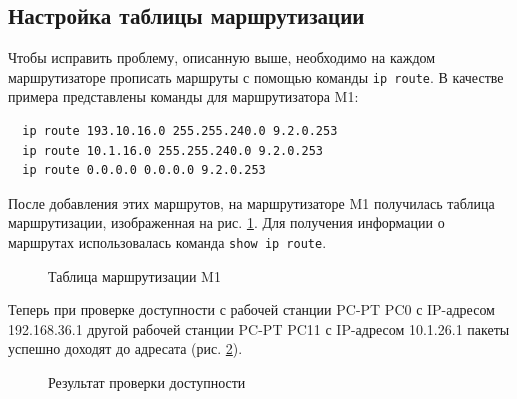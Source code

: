 \documentclass[a4paper, 14pt]{extarticle}
\begin{document}
\subsection{Настройка таблицы маршрутизации}

Чтобы исправить проблему, описанную выше, необходимо на каждом маршрутизаторе
прописать маршруты с помощью команды \texttt{ip route}. В качестве примера
представлены команды для маршрутизатора M1:
\begin{verbatim}
  ip route 193.10.16.0 255.255.240.0 9.2.0.253
  ip route 10.1.16.0 255.255.240.0 9.2.0.253
  ip route 0.0.0.0 0.0.0.0 9.2.0.253
\end{verbatim}
После добавления этих маршрутов, на маршрутизаторе M1 получилась таблица
маршрутизации, изображенная на рис. \ref{fig:ip-route/m1-after.png}. Для
получения информации о маршрутах использовалась команда \texttt{show ip route}.

\begin{figure}[H]
  \centering
  \caption{Таблица маршрутизации M1}
  \label{fig:ip-route/m1-after.png}
\end{figure}

Теперь при проверке доступности с рабочей станции PC-PT PC0 с IP-адресом
192.168.36.1 другой рабочей станции PC-PT PC11 с IP-адресом 10.1.26.1 пакеты
успешно доходят до адресата (рис. \ref{fig:ping/after.png}).

\begin{figure}[H]
  \centering
  \caption{Результат проверки доступности}
  \label{fig:ping/after.png}
\end{figure}
\end{document}

